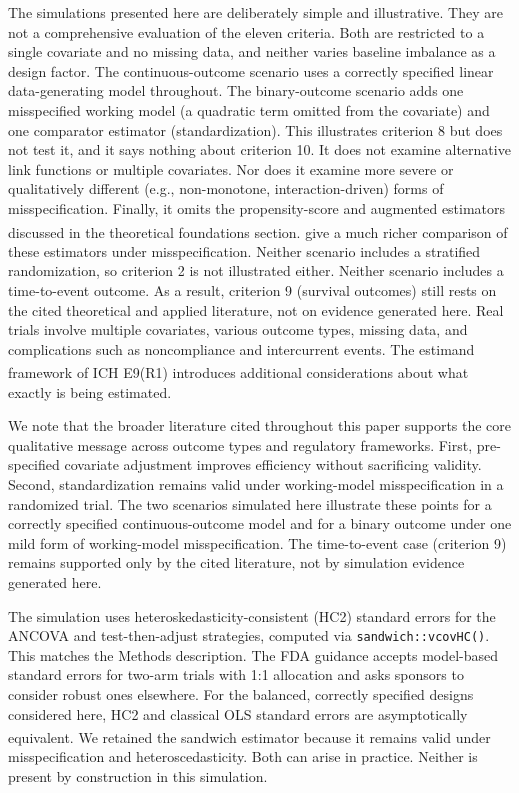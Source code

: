 \documentclass[
  11pt,
]{article}
\begin{document}
The simulations presented here are deliberately simple
and illustrative. They are not a comprehensive
evaluation of the eleven criteria. Both are restricted to
a single covariate and no missing data, and neither
varies baseline imbalance as a design factor. The
continuous-outcome scenario uses a correctly specified
linear data-generating model throughout. The
binary-outcome scenario adds one misspecified working
model (a quadratic term omitted from the covariate) and
one comparator estimator (standardization). This
illustrates criterion 8 but does not test it, and it
says nothing about criterion 10. It does not
examine alternative link functions or multiple
covariates. Nor does it examine more severe or
qualitatively different (e.g., non-monotone,
interaction-driven) forms of misspecification. Finally,
it omits the propensity-score and augmented estimators
discussed in the theoretical foundations section.\textsuperscript{} give a much richer
comparison of these estimators under misspecification.
Neither scenario includes a stratified randomization,
so criterion 2 is not illustrated either. Neither
scenario includes a time-to-event outcome. As a
result, criterion 9 (survival outcomes) still rests on
the cited theoretical and applied literature, not on
evidence generated here. Real trials involve multiple
covariates, various outcome types, missing data, and
complications such as noncompliance and intercurrent
events. The estimand framework of ICH E9(R1)\textsuperscript{} introduces additional
considerations about what exactly is being estimated.

We note that the broader literature cited throughout
this paper supports the core qualitative message across
outcome types and regulatory frameworks. First,
pre-specified covariate adjustment improves efficiency
without sacrificing validity. Second, standardization
remains valid under working-model misspecification in a
randomized trial. The two scenarios simulated here
illustrate these points for a correctly specified
continuous-outcome model and for a binary outcome under
one mild form of working-model misspecification. The
time-to-event case (criterion 9) remains supported only
by the cited literature, not by simulation evidence
generated here.

The simulation uses heteroskedasticity-consistent (HC2)
standard errors for the ANCOVA and test-then-adjust
strategies, computed via \texttt{sandwich::vcovHC()}. This
matches the Methods description. The FDA guidance
accepts model-based standard errors for two-arm trials
with 1:1 allocation and asks sponsors to consider
robust ones elsewhere. For the
balanced, correctly specified designs considered here,
HC2 and classical OLS standard errors are asymptotically
equivalent\textsuperscript{}. We retained the sandwich
estimator because it remains valid under
misspecification and heteroscedasticity. Both can arise
in practice. Neither is present by construction in this
simulation.
\end{document}
